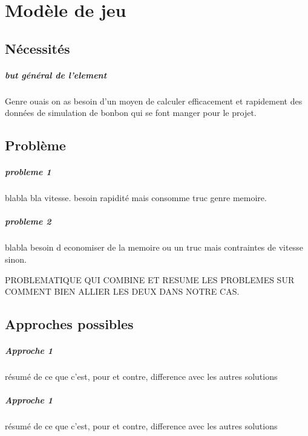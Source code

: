 \chapter{Modèle de jeu}

	\section{Nécessités}
	
		\paragraph{but général de l'element}
		Genre ouais on as besoin d'un moyen de calculer efficacement et rapidement des données de simulation de bonbon qui se font manger pour le projet.
 
	
	\section{Problème}
	
		\paragraph{probleme 1}
		blabla bla vitesse. besoin rapidité mais consomme truc genre memoire.
		
		\paragraph{probleme 2}
		blabla besoin d economiser de la memoire ou un truc mais contraintes de vitesse sinon.
	
		\begin{problem}
			PROBLEMATIQUE QUI COMBINE ET RESUME LES PROBLEMES SUR COMMENT BIEN ALLIER LES DEUX DANS NOTRE CAS.
		\end{problem}
	
	\section{Approches possibles}
	
		\paragraph{Approche 1}
		résumé de ce que c'est, pour et contre, difference avec les autres solutions
		
		
		\paragraph{Approche 1}
		résumé de ce que c'est, pour et contre, difference avec les autres solutions
	

